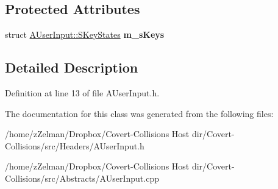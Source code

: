 \subsection*{Protected Attributes}
\begin{DoxyCompactItemize}
\item 
\hypertarget{classAUserInput_a55b881326b920413bbcdf6e02c4fb021}{struct \hyperlink{structAUserInput_1_1SKeyStates}{A\-User\-Input\-::\-S\-Key\-States} {\bfseries m\-\_\-s\-Keys}}\label{classAUserInput_a55b881326b920413bbcdf6e02c4fb021}

\end{DoxyCompactItemize}


\subsection{Detailed Description}


Definition at line 13 of file A\-User\-Input.\-h.



The documentation for this class was generated from the following files\-:\begin{DoxyCompactItemize}
\item 
/home/z\-Zelman/\-Dropbox/\-Covert-\/\-Collisions Host dir/\-Covert-\/\-Collisions/src/\-Headers/A\-User\-Input.\-h\item 
/home/z\-Zelman/\-Dropbox/\-Covert-\/\-Collisions Host dir/\-Covert-\/\-Collisions/src/\-Abstracts/A\-User\-Input.\-cpp\end{DoxyCompactItemize}
